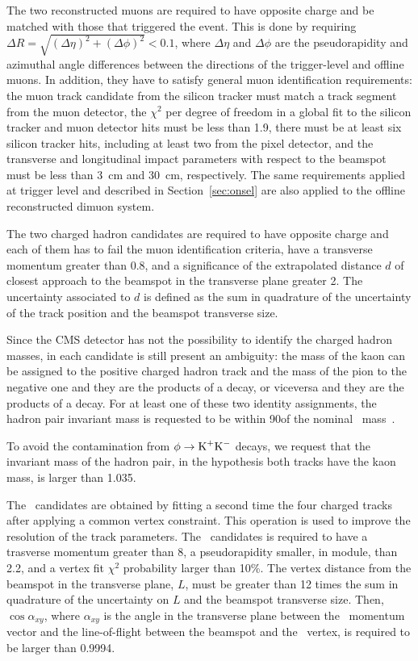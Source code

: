The two reconstructed muons are required to have opposite charge and be matched with those that triggered the event. This is done by requiring $\Delta R = \sqrt{(\Delta\eta)^2+(\Delta\phi)^2}<0.1$, where $\Delta\eta$ and $\Delta\phi$ are the pseudorapidity and azimuthal angle differences between the directions of the trigger-level and offline muons.
In addition, they have to satisfy general muon identification requirements: the muon track candidate from the silicon  tracker must match a track segment from the muon detector, the $\chi^2$ per degree of freedom in a global fit to the silicon tracker and muon detector hits must be less than 1.9, there must be at least six silicon tracker hits, including at least two from the pixel detector, and the transverse and longitudinal impact parameters with respect to the beamspot must be less than \SI{3}{\centi\metre} and \SI{30}{\centi\metre}, respectively.
The same requirements applied at trigger level and described in Section~\ref{sec:onsel} are also applied to the offline reconstructed dimuon system.

The two charged hadron candidates are required to have opposite charge and each of them has to fail the muon identification criteria, have a transverse momentum greater than 0.8\GeV, and a significance of the extrapolated distance $d$ of closest approach to the beamspot in the transverse plane greater 2. The uncertainty associated to $d$ is defined as the sum in quadrature of the uncertainty of the track position and the beamspot transverse size.

Since the CMS detector has not the possibility to identify the charged hadron masses, in each candidate is still present an ambiguity: the mass of the kaon can be assigned to the positive charged hadron track and the mass of the pion to the negative one and they are the products of a \cPKstz decay, or viceversa and they are the products of a \cPAKstz decay.
For at least one of these two identity assignments, the hadron pair invariant mass is requested to be within 90\MeV of the nominal \cPKstz\ mass~\cite{PDG}.

To avoid the contamination from $\phi\to\textrm{K}^{+}\textrm{K}^{-}$ decays, we request that the invariant mass of the hadron pair, in the hypothesis both tracks have the kaon mass, is larger than 1.035\GeV.

The \PBz\ candidates are obtained by fitting a second time the four charged tracks after applying a common vertex constraint. This operation is used to improve the resolution of the track parameters.
The \PBz\ candidates is required to have a trasverse momentum greater than 8\GeV, a pseudorapidity smaller, in module, than 2.2, and a vertex fit $\chi^2$ probability larger than 10\%.
The vertex distance from the beamspot in the transverse plane, $L$, must be greater than 12 times the sum in quadrature of the uncertainty on $L$ and the beamspot transverse size. Then, $\cos{\alpha_{xy}}$, where $\alpha_{xy}$ is the angle in the transverse plane between the \PBz\ momentum vector and the line-of-flight between the beamspot and the \PBz\ vertex, is required to be larger than 0.9994.

